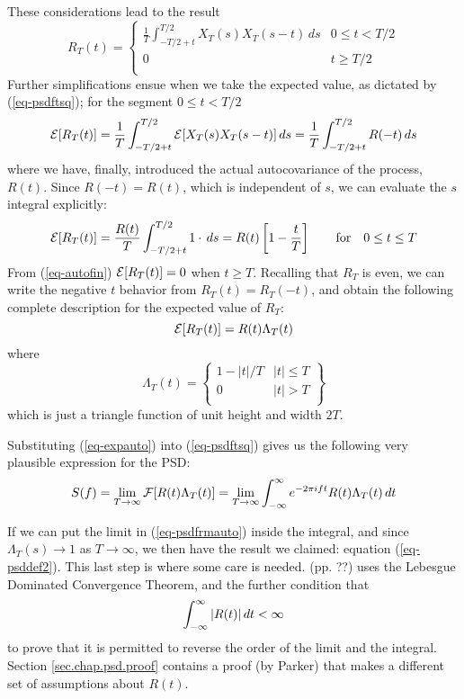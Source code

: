 \documentclass[12pt]{article}\usepackage{graphicx, color}
\begin{document}
These considerations lead to the result
%
\begin{equation}
\label{eq-autofin}
R_T (t) = 
\left \{
\begin{array}{cc}
\frac{1}{T} \int_{-T/2+ t }^{T/2} X_T (s) X_T (s - t ) \, ds & 0 \le t < T/2 \\
0 & t \ge T/2 \\
\end{array}
\right .
\end{equation}
%
Further simplifications ensue when we take the expected value, as
dictated by (\ref{eq-psdftsq}); for the segment $0 \le t < T/2$
%
\[
\mathcal{E} [ R_T (t) ] = \frac{1}{T} \int_{-T/2+ t }^{T/2}
\mathcal{E} [ X_T (s) X_T (s - t ) ] \, ds
= \frac{1}{T} \int_{-T/2+ t }^{T/2} R(-t) \, ds
\]
%
where we have, finally,
introduced the actual autocovariance of the process, $R(t)$.
Since $R(-t) = R(t)$, which is independent
of $s$, we can evaluate the $s$ integral explicitly:
%
\begin{equation}
\mathcal{E} [ R_T (t) ] = \frac{R(t)}{T} \int_{-T/2+ t }^{T/2}
1 \cdot \, ds = R(t) \left [ 1 - \frac{t}{T} \right ]
\qquad \mathrm{for} \quad 0 \le t \le T
\end{equation}
%
From (\ref{eq-autofin}) $\mathcal{E} [ R_T (t) ] = 0$ when $t \ge T$.
Recalling that $R_T$
is even, we can write
the negative $t$ behavior from $R_T (t) = R_T (-t)$,
and obtain the following complete description for the
expected value of $R_T$:
%
\begin{equation}
\label{eq-expauto}
\mathcal{E} [ R_T (t)] = R(t) \Lambda_T (t)
\end{equation}
%
where
%
\[
\Lambda_T (t) =
\left \{
\begin{array}{cc}
1 - | t | / T & |t| \le T \\
0 & | t | > T \\
\end{array}
\right \}
\]
%
which is just a triangle function of unit height
and width $2T$.

Substituting (\ref{eq-expauto}) into
(\ref{eq-psdftsq}) gives us the following
very plausible expression for the PSD:
%
\begin{equation}
\label{eq-psdfrmauto}
S(f) = 
\lim_{T \to \infty} 
\mathcal{F} [ R(t) \Lambda_T (t) ] = 
\lim_{T \to \infty} 
\int_{- \infty} ^{\infty} e ^ {-2 \pi i ft } R(t) \Lambda_T (t) \, dt
\end{equation}

If we can put the limit in (\ref{eq-psdfrmauto}) inside the integral,
and since $ \Lambda_T (s) \to 1$ as $T \to \infty$,
we then have the result we claimed:
equation (\ref{eq-psddef2}).
This last step is where some care is needed.
\citet{Priestley81} (pp. ??)
uses the Lebesgue Dominated Convergence Theorem, and the
further condition that
%
\begin{equation}
\label{eq-autorestr}
\int_{- \infty} ^{\infty} | R(t) | \, dt < \infty 
\end{equation}
%
to prove that it is permitted to reverse the order of the limit 
and the integral.
Section \ref{sec.chap.psd.proof} contains
a proof (by Parker)
that makes a different set of assumptions about $R(t)$.
\end{document}
